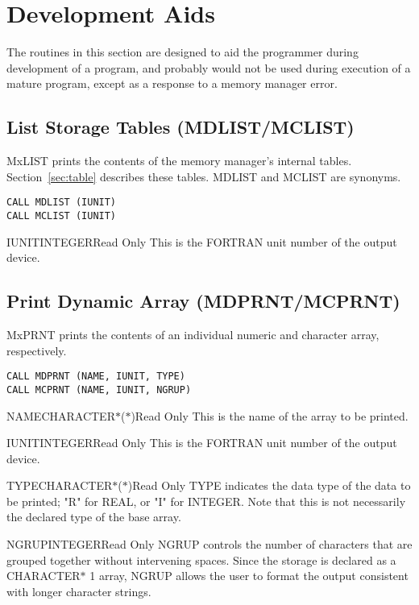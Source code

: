 \section{Development Aids}\label{sec:mdev}
The routines in this section are designed to aid the programmer during
development of a program, and probably would not be used during execution of
a mature program, except as a response to a memory manager error.

\subsection{List Storage Tables (MDLIST/MCLIST)}
MxLIST prints the contents of the memory manager's internal
tables. Section~\ref{sec:table} describes these tables. MDLIST and MCLIST
are synonyms.
\begin{verbatim}
CALL MDLIST (IUNIT)
CALL MCLIST (IUNIT)
\end{verbatim}

\begin{argy}{IUNIT}{INTEGER}{Read Only}
This is the FORTRAN unit number of the output device.
\end{argy}

\subsection{Print Dynamic Array (MDPRNT/MCPRNT)}
MxPRNT prints the contents of an individual numeric and
character array, respectively.
\begin{verbatim}
CALL MDPRNT (NAME, IUNIT, TYPE)
CALL MCPRNT (NAME, IUNIT, NGRUP)
\end{verbatim}

\begin{argy}{NAME}{CHARACTER$*$($*$)}{Read Only}
This is the name of the array to be printed.
\end{argy}

\begin{argy}{IUNIT}{INTEGER}{Read Only}
This is the FORTRAN unit number of the output device.
\end{argy}

\begin{argy}{TYPE}{CHARACTER$*$($*$)}{Read Only}
TYPE indicates the data type of the data to be printed; "R" for REAL, or
"I" for INTEGER.  Note that this is not necessarily the declared type of the
base array.
\end{argy}

\begin{argy}{NGRUP}{INTEGER}{Read Only}
NGRUP controls the number of characters that are grouped together without
intervening spaces. Since the storage is declared as a CHARACTER$*$ 1
array, NGRUP allows the user to format the output consistent with longer
character strings.
\end{argy}

